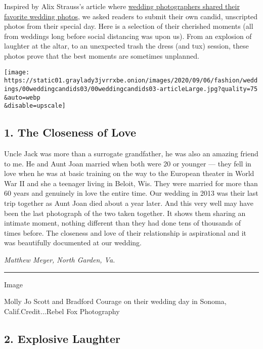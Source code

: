 Inspired by Alix Strauss's article where
\href{https://www.nytimes3xbfgragh.onion/2020/01/28/fashion/weddings/wedding-photographers-share-their-favorite-moments.html}{wedding
photographers shared their favorite wedding photos}, we asked readers to
submit their own candid, unscripted photos from their special day. Here
is a selection of their cherished moments (all from weddings long before
social distancing was upon us). From an explosion of laughter at the
altar, to an unexpected trash the dress (and tux) session, these photos
prove that the best moments are sometimes unplanned.

\texttt{[image: https://static01.graylady3jvrrxbe.onion/images/2020/09/06/fashion/weddings/00weddingcandids03/00weddingcandids03-articleLarge.jpg?quality=75\\\&auto=webp\\\&disable=upscale]}

\hypertarget{1-the-closeness-of-love}{%
\subsection{1. The Closeness of Love}\label{1-the-closeness-of-love}}

Uncle Jack was more than a surrogate grandfather, he was also an amazing
friend to me. He and Aunt Joan married when both were 20 or younger ---
they fell in love when he was at basic training on the way to the
European theater in World War II and she a teenager living in Beloit,
Wis. They were married for more than 60 years and genuinely in love the
entire time. Our wedding in 2013 was their last trip together as Aunt
Joan died about a year later. And this very well may have been the last
photograph of the two taken together. It shows them sharing an intimate
moment, nothing different than they had done tens of thousands of times
before. The closeness and love of their relationship is aspirational and
it was beautifully documented at our wedding.

\emph{Matthew Meyer, North Garden, Va.}

\begin{center}\rule{0.5\linewidth}{\linethickness}\end{center}

Image

Molly Jo Scott and Bradford Courage on their wedding day in Sonoma,
Calif.Credit...Rebel Fox Photography

\hypertarget{2-explosive-laughter}{%
\subsection{2. Explosive Laughter}\label{2-explosive-laughter}}

